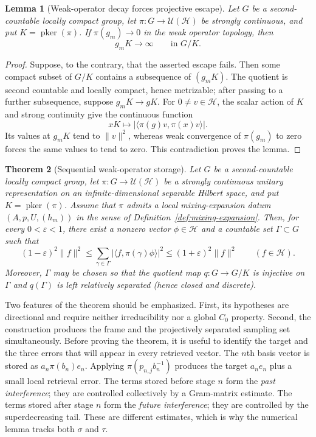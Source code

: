 \documentclass[reqno]{amsart}
\numberwithin{equation}{section}
\newtheorem{theorem}{Theorem}[section]
\newtheorem{lemma}[theorem]{Lemma}
\theoremstyle{definition}
\theoremstyle{remark}
\newcommand{\cH}{\mathcal H}
\newcommand{\U}{\mathcal U}
\newcommand{\pker}{\operatorname{pker}}
\begin{document}
\begin{lemma}[Weak-operator decay forces projective escape]
\label{lem:wot-projective-escape}
Let $G$ be a second-countable locally compact group, let
$\pi:G\to\U(\cH)$ be strongly continuous, and put $K=\pker(\pi)$.  If
$\pi(g_m)\to0$ in the weak operator topology, then
\[
  g_mK\longrightarrow\infty\qquad\text{in }G/K.
\]
\end{lemma}

\begin{proof}
Suppose, to the contrary, that the asserted escape fails.  Then some compact
subset of $G/K$ contains a subsequence of $(g_mK)$.
The quotient is second countable and locally compact, hence metrizable; after
passing to a further subsequence, suppose $g_mK\to gK$.  For $0\neq v\in\cH$,
the scalar action of $K$ and strong continuity give the continuous function
\[
 xK\longmapsto |\langle\pi(g)v,\pi(x)v\rangle|.
\]
Its values at $g_mK$ tend to $\|v\|^2$, whereas weak convergence of
$\pi(g_m)$ to zero forces the same values to tend to zero.  This
contradiction proves the lemma.
\end{proof}

\begin{theorem}[Sequential weak-operator storage]
\label{thm:abstract-storage}
Let $G$ be a second-countable locally compact group, let
$\pi:G\to\U(\cH)$ be a strongly continuous unitary representation on an
infinite-dimensional separable Hilbert space, and put $K=\pker(\pi)$.
Assume that $\pi$ admits a local mixing-expansion datum
$(A,p,U,(h_m))$ in the sense of Definition~\ref{def:mixing-expansion}.
Then, for every $0<\varepsilon<1$, there exist a nonzero vector
$\phi\in\cH$ and a countable set $\Gamma\subset G$ such that
\begin{equation}\label{eq:storage-frame}
 (1-\varepsilon)^2\|f\|^2
 \leq \sum_{\gamma\in\Gamma}
       |\langle f,\pi(\gamma)\phi\rangle|^2
 \leq (1+\varepsilon)^2\|f\|^2
 \qquad(f\in\cH).
\end{equation}
Moreover, $\Gamma$ may be chosen so that the quotient map
$q:G\to G/K$ is injective on $\Gamma$ and $q(\Gamma)$ is left relatively
separated (hence closed and discrete).
\end{theorem}

Two features of the theorem should be emphasized.  First, its hypotheses are
directional and require neither irreducibility nor a global $C_0$ property.
Second, the construction produces the frame and the projectively separated
sampling set simultaneously.  Before proving the theorem, it is useful to
identify the target and the
three errors that will appear in every retrieved vector.  The $n$th basis
vector is stored as $a_n\pi(b_n)e_n$.  Applying
$\pi(p_{n,j}b_n^{-1})$ produces the target $a_ne_n$ plus a small local
retrieval error.  The terms stored before stage $n$ form the \emph{past
interference}; they are controlled collectively by a Gram-matrix estimate.
The terms stored after stage $n$ form the \emph{future interference}; they
are controlled by the superdecreasing tail.  These are different estimates,
which is why the numerical lemma tracks both $\sigma$ and $\tau$.
\end{document}
